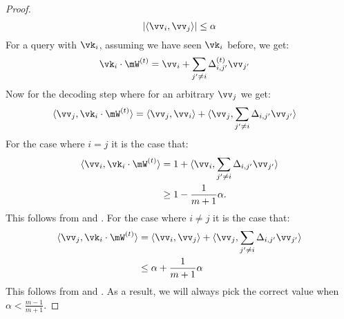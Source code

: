 \begin{proof}
\begin{equation} \label{eq:value bound}
    \left|\langle \vv_{i}, \vv_{j} \rangle \right| \le \alpha
\end{equation}
For a query with $\vk_{i}$, assuming we have seen $\vk_{i}$ before, we get:
\begin{align*}
    \vk_{i}\cdot\mW^{(\timestep)} &=\vv_{i} + \sum_{j'\neq i} \Delta_{i,j'}^{(\timestep)} \vv_{j'}
\end{align*}
Now for the decoding step where for an arbitrary $\vv_{j}$ we get:
\begin{align*}
    \langle \vv_{j}, \vk_{i}\cdot\mW^{(\timestep)} \rangle &=\langle \vv_{j}, \vv_{i}\rangle + \langle \vv_{j}, \sum_{j'\neq i} \Delta_{i,j'} \vv_{j'} \rangle
\end{align*}
For the case where $i=j$ it is the case that:
\begin{align*}\langle \vv_{i}, \vk_{i}\cdot\mW^{(\timestep)} \rangle &=1 + \langle \vv_{i}, \sum_{j'\neq i} \Delta_{i,j'} \vv_{j'} \rangle \\
&\ge 1 - \frac{1}{m+1} \alpha.
\end{align*}
This follows from  and .
For the case where $i\neq j$ it is the case that:
\begin{align*}\langle \vv_{j}, \vk_{i}\cdot\mW^{(\timestep)} \rangle &= \langle \vv_i, \vv_j \rangle + \langle \vv_{j}, \sum_{j'\neq i} \Delta_{i,j'} \vv_{j'} \rangle \\
&\le \alpha + \frac{1}{m+1} \alpha
\end{align*}
This follows from  and .
As a result, we will always pick the correct value when $\alpha < \frac{m-1}{m+1}$.
\end{proof}